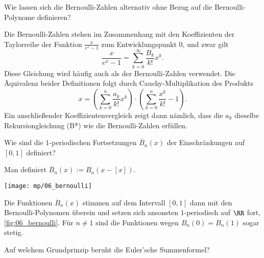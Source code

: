   \begin{frage}
    Wie lassen sich die Bernoulli-Zahlen alternativ ohne 
    Bezug auf die Bernoulli-Polynome definieren?
  \end{frage}

  \begin{antwort}
    Die Bernoulli-Zahlen stehen im Zusammenhang mit den 
    Koeffizienten der Taylorreihe der Funktion 
    $\frac{x}{e^x-1}$ zum Entwicklungspunkt $0$, und zwar gilt 
    \[
    \frac{x}{e^x-1} = \sum_{k=0}^\infty \frac{B_k}{k!} x^k.
    \]
    Diese Gleichung wird häufig auch als 
     der Bernoulli-Zahlen 
    verwendet. Die Äquivalenz beider Definitionen folgt durch 
    Cauchy-Multiplikation des Produkts  
    \[
    x = \left( \sum_{k=0}^n \frac{a_k}{k!} x^k \right)\cdot 
    \left( \sum_{k=0}^n \frac{x^k}{k!}-1 \right).
    \]
    Ein anschließender Koeffizientenvergleich zeigt dann nämlich, dass 
    die $a_k$ dieselbe Rekursiongleichung 
    (B*) wie die Bernoulli-Zahlen erfüllen. 
    \AntEnd

    \smallskip
  \end{antwort}

  \smallskip
  \begin{frage}
    Wie sind die $1$-periodischen Fortsetzungen $\overline{B}_n (x)$ 
    der Einschränkungen auf $[0,1]$ definiert?
  \end{frage}

  \begin{antwort}
    Man definiert $\overline{B}_n( x ) := B_n(x-[x])$. 

    \begin{center}
      \texttt{[image: mp/06\_bernoulli]}
      \label{fig:06_bernoulli}
    \end{center}

    Die Funktionen 
    $\overline{B}_n( x )$ stimmen auf dem Intervall $[0,1]$ dann mit den 
    Bernoulli-Polynomen überein und setzen sich ansonsten $1$-periodisch 
    auf $\RR$ fort, \sieheAbbildung\ref{fig:06_bernoulli}. 
    Für $n\not=1$ sind die Funktionen wegen $B_n(0)=B_n(1)$ sogar stetig. \AntEnd
  \end{antwort} 


  \begin{frage}\label{06_grundprinzip}
    Auf welchem Grundprinzip beruht die Euler'sche Summenformel?
  \end{frage}

